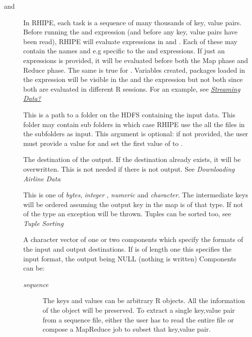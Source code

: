 \documentclass[letterpaper,10pt,english]{sphinxmanual}
\begin{document}
\begin{description}
\item[{ and }] \leavevmode
In RHIPE, each task is a sequence of many thousands of
key, value pairs. Before running the  and  expression
(and before any key, value pairs have been read),
RHIPE will evaluate expressions in  and . Each of
these may contain the names  and  e.g
 specific to the  and 
expressions. If just an expressions is provided, it will be evaluated before
both the Map phase and Reduce phase. The same is true for
. Variables created, packages loaded in the  expression
will be visible in the  and the  expression but not both since
both are evaluated in different R sessions. For an example, see \hyperref[airline:streaming-data]{\emph{Streaming Data?}}

\item[{}] \leavevmode
This is a path to a folder on the HDFS containing the input
data. This folder may contain sub folders in which case RHIPE use the all the
files in the subfolders as input. This argument is optional: if not provided,
the user must provide a value for  and set the first value of
 to .

\item[{}] \leavevmode
The destination of the output. If the destination already exists,
it will be overwritten. This is not needed if there is not output. See \emph{Downloading Airline Data}

\item[{}] \leavevmode
This is one of \emph{bytes}, \emph{integer} ,  \emph{numeric} and \emph{character}. The intermediate keys will be ordered assuming the
output key in the map is of that type. If not of the type an exception will be thrown. Tuples can be sorted too, see \emph{Tuple Sorting}

\item[{}] \leavevmode
A character vector of one or two components which specify the formats of
the input and output destinations. If  is of length one this specifies the input format, the output being NULL (nothing is written)
Components can be:
\begin{description}
\item[{\emph{sequence}}] \leavevmode
The keys and values can be arbitrary R objects. All the
information of the object will be preserved. To extract a single key,value
pair from a sequence file, either the user has to read the entire file or
compose a MapReduce job to subset that key,value pair.


\end{description}
\end{description}
\end{document}
